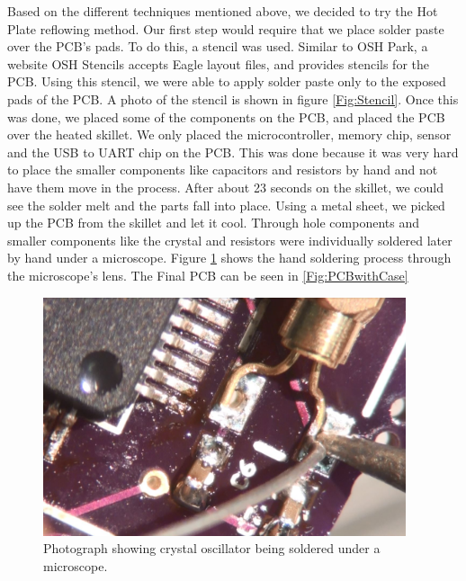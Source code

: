 Based on the different techniques mentioned above,
we decided to try the Hot Plate reflowing method.
Our first step would require that we place solder paste over the PCB's pads.
To do this,
a stencil was used.
Similar to OSH Park, a website OSH Stencils accepts Eagle layout files,
and provides stencils for the PCB.
Using this stencil,
we were able to apply solder paste only to the exposed pads of the PCB.
A photo of the stencil is shown in figure \ref{Fig:Stencil}.
Once this was done,
we placed some of the components on the PCB,
and placed the PCB over the heated skillet.
We only placed the microcontroller, memory chip, sensor and the USB to UART chip on the PCB.
This was done because it was very hard to place the smaller components like capacitors and resistors by hand and not have them move in the process.
After about 23 seconds on the skillet,
we could see the solder melt and the parts fall into place.
Using a metal sheet,
we picked up the PCB from the skillet and let it cool.
Through hole components and smaller components like the crystal and resistors were individually soldered later by hand under a microscope.
Figure \ref{Fig:PCBMicro} shows the hand soldering process through the microscope's lens. The Final PCB can be seen in \ref{Fig:PCBwithCase}
\begin{figure}
\begin{center}
\includegraphics[width=0.95\textwidth]{images/PCBMicro.jpg}
\caption{Photograph showing crystal oscillator being soldered under a microscope.}
\label{Fig:PCBMicro}
\end{center}
\end{figure}
